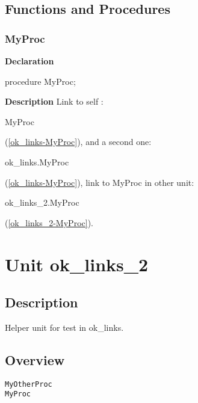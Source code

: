 \documentclass{report}
\begin{document}
\section{Functions and Procedures}
\subsection*{MyProc}
\begin{list}{}{
\setlength{\itemindent}{0cm}
\setlength{\listparindent}{0cm}
\setlength{\leftmargin}{\evensidemargin}
\addtolength{\leftmargin}{\tmplength}
\settowidth{\labelsep}{X}
\addtolength{\leftmargin}{\labelsep}
\setlength{\labelwidth}{\tmplength}
}
\begin{flushleft}
\item[\textbf{Declaration}\hfill]
\begin{ttfamily}
procedure MyProc;\end{ttfamily}


\end{flushleft}
\par
\item[\textbf{Description}]
Link to self : \begin{ttfamily}MyProc\end{ttfamily}(\ref{ok_links-MyProc}), and a second one: \begin{ttfamily}ok{\_}links.MyProc\end{ttfamily}(\ref{ok_links-MyProc}), link to MyProc in other unit: \begin{ttfamily}ok{\_}links{\_}2.MyProc\end{ttfamily}(\ref{ok_links_2-MyProc}).

\end{list}
\chapter{Unit ok{\_}links{\_}2}
\section{Description}
Helper unit for test in ok{\_}links.
\section{Overview}
\begin{description}
\item[\texttt{\begin{ttfamily}TSomeClass\end{ttfamily} Class}]
\item[\texttt{\begin{ttfamily}TSomeOtherClass\end{ttfamily} Class}]
\end{description}
\begin{description}
\item[\texttt{MyOtherProc}]
\item[\texttt{MyProc}]
\end{description}
\end{document}
